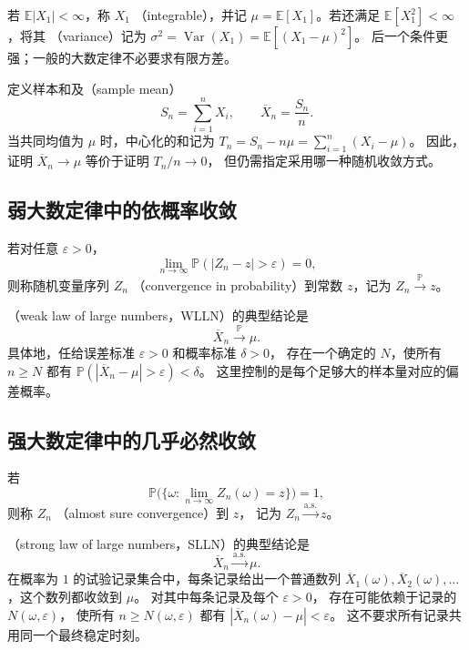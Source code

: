 \documentclass[UTF8]{ctexart}
\begin{document}
若 $\mathbb E|X_1|<\infty$，称 $X_1$ （integrable），并记
$\mu=\mathbb E[X_1]$。若还满足 $\mathbb E[X_1^2]<\infty$，将其
（variance）记为
$\sigma^2=\operatorname{Var}(X_1)=\mathbb E[(X_1-\mu)^2]$。
后一个条件更强；一般的大数定律不必要求有限方差。

定义样本和及（sample mean）
\begin{equation}
  S_n=\sum_{i=1}^nX_i,\qquad
  \overline X_n=\frac{S_n}{n}.
  \label{eq:lln-sample-mean}
\end{equation}
当共同均值为 $\mu$ 时，中心化的和记为
$T_n=S_n-n\mu=\sum_{i=1}^n(X_i-\mu)$。
因此，证明 $\overline X_n\to\mu$ 等价于证明 $T_n/n\to0$，
但仍需指定采用哪一种随机收敛方式。

\subsection{弱大数定律中的依概率收敛}

\begin{definition}[依概率收敛]
\label{def:lln-probability-convergence}
若对任意 $\varepsilon>0$，
\[
  \lim_{n\to\infty}\mathbb P(|Z_n-z|>\varepsilon)=0,
\]
则称随机变量序列 $Z_n$ 
（convergence in probability）到常数 $z$，记为 $Z_n\xrightarrow{\mathbb P}z$。
\end{definition}

（weak law of large numbers，WLLN）的典型结论是
\begin{equation}
  \overline X_n\xrightarrow{\mathbb P}\mu.
  \label{eq:lln-wlln-statement}
\end{equation}
具体地，任给误差标准 $\varepsilon>0$ 和概率标准 $\delta>0$，
存在一个确定的 $N$，使所有 $n\geq N$ 都有
$\mathbb P(|\overline X_n-\mu|>\varepsilon)<\delta$。
这里控制的是每个足够大的样本量对应的偏差概率。

\subsection{强大数定律中的几乎必然收敛}

\begin{definition}[几乎必然收敛]
\label{def:lln-almost-sure-convergence}
若
\[
  \mathbb P\bigl(\{\omega:\lim_{n\to\infty}Z_n(\omega)=z\}\bigr)=1,
\]
则称 $Z_n$ （almost sure convergence）到 $z$，
记为 $Z_n\xrightarrow{\mathrm{a.s.}}z$。
\end{definition}

（strong law of large numbers，SLLN）的典型结论是
\begin{equation}
  \overline X_n\xrightarrow{\mathrm{a.s.}}\mu.
  \label{eq:lln-slln-statement}
\end{equation}
在概率为 $1$ 的试验记录集合中，每条记录给出一个普通数列
$\overline X_1(\omega),\overline X_2(\omega),\ldots$，这个数列都收敛到 $\mu$。
对其中每条记录及每个 $\varepsilon>0$，
存在可能依赖于记录的 $N(\omega,\varepsilon)$，
使所有 $n\geq N(\omega,\varepsilon)$ 都有
$|\overline X_n(\omega)-\mu|<\varepsilon$。
这不要求所有记录共用同一个最终稳定时刻。
\end{document}
